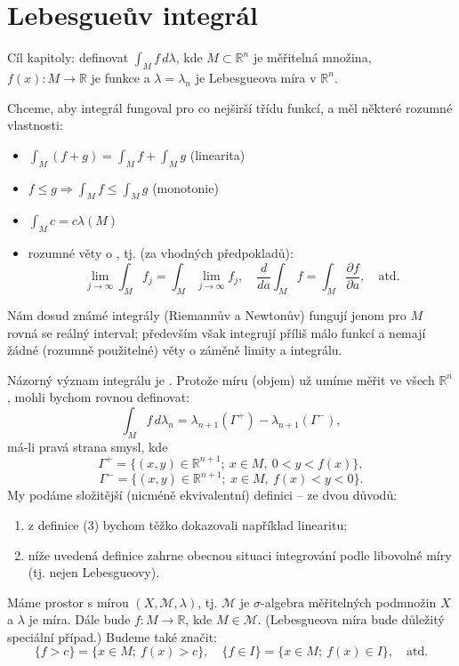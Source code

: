\section{Lebesgueův integrál}

\noindent
Cíl kapitoly: definovat $\int_M f \, d\lambda$, kde
$M \subset \mathbb{R}^n$ je měřitelná množina, $f(x) : M \to \mathbb{R}$
je funkce a $\lambda = \lambda_n$ je Lebesgueova míra v $\mathbb{R}^n$.

Chceme, aby integrál fungoval pro co nejširší třídu funkcí, a měl
některé rozumné vlastnosti:
\begin{itemize}
\item $\int_M (f + g) = \int_M f + \int_M g$ (linearita)
\item $f \le g \Rightarrow \int_M f \le \int_M g$ (monotonie)
\item $\int_M c = c\lambda(M)$
\item rozumné věty o , tj. (za vhodných
předpokladů):
\[
\lim_{j \to \infty} \int_M f_j = \int_M \lim_{j \to \infty} f_j,
\quad
\frac{d}{da} \int_M f = \int_M \frac{\partial f}{\partial a},
\quad
\text{atd.}
\]
\end{itemize}

Nám dosud známé integrály (Riemannův a Newtonův) fungují jenom pro $M$
rovná se reálný interval; především však integrují příliš málo funkcí
a nemají žádné (rozumně použitelné) věty o záměně limity a integrálu.

Názorný význam integrálu je . Protože míru
(objem) už umíme měřit ve všech $\mathbb{R}^n$, mohli bychom rovnou
definovat:
\[
\int_M f \, d\lambda_n
= \lambda_{n+1}(\Gamma^+) - \lambda_{n+1}(\Gamma^-), \tag{3}
\]
má-li pravá strana smysl, kde
\[
\Gamma^+ = \{(x, y) \in \mathbb{R}^{n+1}; \ x \in M, \ 0 < y < f(x)\},
\]
\[
\Gamma^- = \{(x, y) \in \mathbb{R}^{n+1}; \ x \in M, \ f(x) < y < 0\}.
\]
My podáme složitější (nicméně ekvivalentní) definici -- ze dvou důvodů:
\begin{enumerate}[1.]
\item z definice (3) bychom těžko dokazovali například linearitu;
\item níže uvedená definice zahrne obecnou situaci integrování podle
libovolné míry (tj. nejen Lebesgueovy).
\end{enumerate}

\begin{poznamka}
Máme prostor s mírou $(X, \mathcal{M}, \lambda)$, tj. $\mathcal{M}$ je
$\sigma$-algebra měřitelných podmnožin $X$ a $\lambda$ je míra. Dále
bude $f : M \to \mathbb{R}$, kde $M \in \mathcal{M}$. (Lebesgueova míra
bude důležitý speciální případ.) Budeme také značit:
\[
\{f > c\} = \{x \in M; \ f(x) > c\}, \quad
\{f \in I\} = \{x \in M; \ f(x) \in I\}, \quad
\text{atd.}
\]
\end{poznamka}

